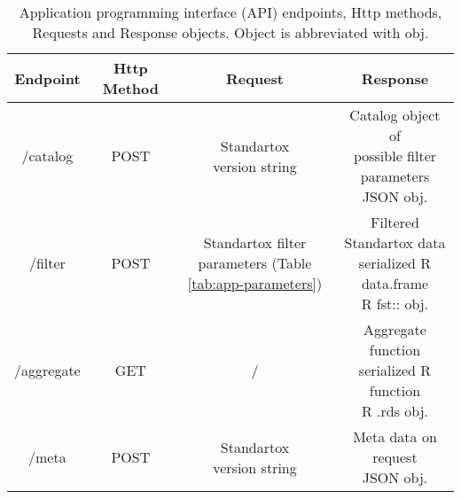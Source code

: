 \begin{table}[ht]
  \caption{Application programming interface (API) endpoints, Http methods, Requests and Response objects. Object is abbreviated with obj.}
  \label{tab:api-endpoints}
  \centering
\begin{tabular}{cccc}
  \hline
  Endpoint & Http Method & Request & Response \\ 
  \hline
  /catalog & POST & \makecell{Standartox \\ version string} & \makecell{Catalog object of \\ possible filter parameters \\ JSON obj.}    \\[0.5cm]
  /filter & POST & \makecell{Standartox filter \\ parameters (Table \ref{tab:app-parameters})} & \makecell{Filtered Standartox data \\ serialized R data.frame \\ R fst:: \citep{klik_fst_2019} obj.}   \\[0.5cm]
  /aggregate & GET & / & \makecell{Aggregate function \\ serialized R function \\ R .rds \citep{rcoreteam_language_2017} obj.}    \\[0.5cm]
  /meta & POST & \makecell{Standartox \\ version string} & \makecell{Meta data on request \\ JSON obj.}    \\
  \hline
\end{tabular}
\end{table}

